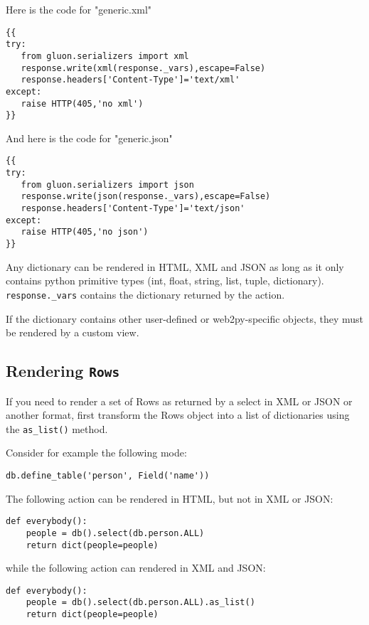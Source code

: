 \documentclass[justified,sixbynine,notoc]{tufte-book}
\def\ft{\small\tt}
\def\inxx#1{\index{#1}}
\begin{document}
\begin{fullwidth}
Here is the code for "generic.xml"
\begin{lstlisting}[keywords={}]
{{
try:
   from gluon.serializers import xml
   response.write(xml(response._vars),escape=False)
   response.headers['Content-Type']='text/xml'
except:
   raise HTTP(405,'no xml')
}}
\end{lstlisting}

And here is the code for "generic.json"
\begin{lstlisting}[keywords={}]
{{
try:
   from gluon.serializers import json
   response.write(json(response._vars),escape=False)
   response.headers['Content-Type']='text/json'
except:
   raise HTTP(405,'no json')
}}
\end{lstlisting}

Any dictionary can be rendered in HTML, XML and JSON as long as it only contains python primitive types (int, float, string, list, tuple, dictionary). {\ft response.\_vars} contains the dictionary returned by the action.

If the dictionary contains other user-defined or web2py-specific objects, they must be rendered by a custom view.

\goodbreak\subsection{Rendering {\ft Rows}}

\inxx{as\_list}

If you need to render a set of Rows as returned by a select in XML or JSON or another format,
first transform the Rows object into a list of dictionaries using the {\ft as\_list()} method.

Consider for example the following mode:
\begin{lstlisting}
db.define_table('person', Field('name'))
\end{lstlisting}

The following action can be rendered in HTML, but not in XML or JSON:
\begin{lstlisting}
def everybody():
    people = db().select(db.person.ALL)
    return dict(people=people)
\end{lstlisting}
\noindent while the following action can rendered in XML and JSON:

\begin{lstlisting}
def everybody():
    people = db().select(db.person.ALL).as_list()
    return dict(people=people)
\end{lstlisting}


\end{fullwidth}
\end{document}
